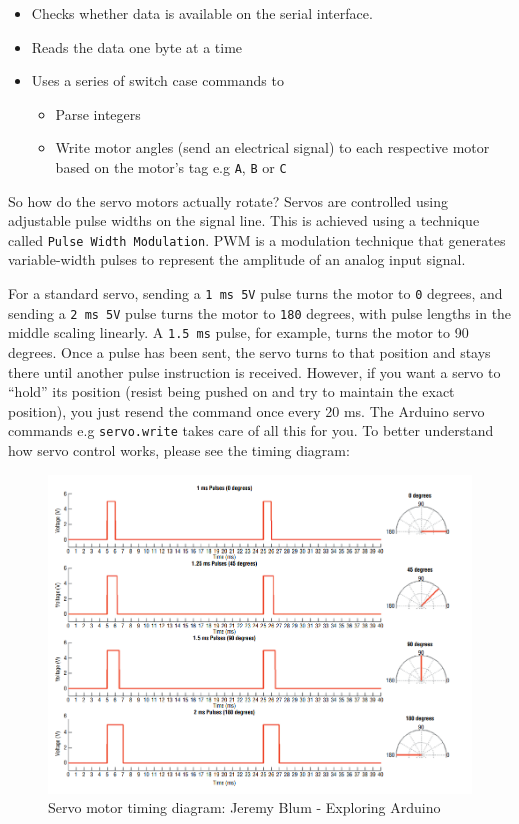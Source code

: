 \documentclass[
  letterpaper,
  DIV=11,
  numbers=noendperiod]{scrreprt}
\begin{document}
\begin{itemize}
\item
  Checks whether data is available on the serial interface.
\item
  Reads the data one byte at a time
\item
  Uses a series of switch case commands to

  \begin{itemize}
  \item
    Parse integers
  \item
    Write motor angles (send an electrical signal) to each respective
    motor based on the motor's tag e.g \texttt{A}, \texttt{B} or
    \texttt{C}
  \end{itemize}
\end{itemize}

So how do the servo motors actually rotate? Servos are controlled using
adjustable pulse widths on the signal line. This is achieved using a
technique called \texttt{Pulse\ Width\ Modulation}. PWM is a modulation
technique that generates variable-width pulses to represent the
amplitude of an analog input signal.

For a standard servo, sending a \texttt{1\ ms\ 5V} pulse turns the motor
to \texttt{0} degrees, and sending a \texttt{2\ ms\ 5V} pulse turns the
motor to \texttt{180} degrees, with pulse lengths in the middle scaling
linearly. A \texttt{1.5\ ms} pulse, for example, turns the motor to 90
degrees. Once a pulse has been sent, the servo turns to that position
and stays there until another pulse instruction is received. However, if
you want a servo to ``hold'' its position (resist being pushed on and
try to maintain the exact position), you just resend the command once
every 20 ms. The Arduino servo commands e.g \texttt{servo.write} takes
care of all this for you. To better understand how servo control works,
please see the timing diagram:

\begin{figure}

{\centering \includegraphics[width=5.20833in,height=\textheight]{./images/servo_timing.PNG}

}

\caption{Servo motor timing diagram: Jeremy Blum - Exploring Arduino}

\end{figure}
\end{document}
